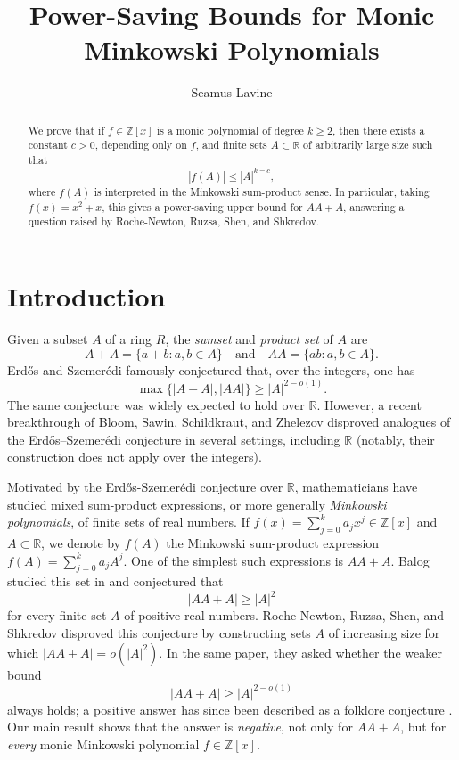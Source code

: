 \documentclass[11pt]{amsart}
\title{Power-Saving Bounds for Monic Minkowski Polynomials}
\theoremstyle{plain}
\theoremstyle{definition}\newtheorem{remark}[theorem]{Remark}
\theoremstyle{definition}\newtheorem*{remark*}{Remark}
\theoremstyle{definition}\newtheorem{definition}[theorem]{Definition}
\theoremstyle{definition}\newtheorem*{definition*}{Definition}
\theoremstyle{definition}\newtheorem*{idea}{Idea}
\theoremstyle{definition}\newtheorem*{comments}{Comment}
\theoremstyle{definition}\newtheorem{example}[theorem]{Example}
\theoremstyle{definition}\newtheorem*{example*}{Example}
\newcommand{\0}{\varnothing} %
\def\Z{\mathbb{Z}} %
\def\R{\mathbb{R}} %
\begin{document}
\begin{abstract}
We prove that if $f\in \Z[x]$ is a monic polynomial of degree
$k\geq 2$, then there exists a constant $c>0$, depending only on $f$, and finite sets
$A\subset \mathbb R$ of arbitrarily large size such that
\[
|f(A)|\leq |A|^{k-c},
\]
where $f(A)$ is interpreted in the Minkowski sum-product sense. In
particular, taking $f(x)=x^2+x$, this gives a power-saving upper bound
for $AA+A$, answering a question raised by Roche-Newton, Ruzsa, Shen, and
Shkredov.
\end{abstract}

\author{Seamus Lavine}

\maketitle

\section{Introduction}
Given a subset $A$ of a ring $R$, the \textit{sumset} and \textit{product set} of $A$ are
\[
A+A=\{a+b:a,b\in A\}\quad\text{and}\quad AA=\{ab:a,b\in A\}.
\]
Erd\H{o}s and Szemer\'{e}di famously conjectured that, over the integers, one has
\[
\max\{|A+A|,|AA|\}\geq|A|^{2-o(1)}.
\]
The same conjecture was widely expected to hold over $\R$. However, a recent breakthrough of Bloom, Sawin, Schildkraut, and Zhelezov \cite{BloomSawinSchildkrautZhelezov2026} disproved analogues of the Erd\H{o}s--Szemer\'edi conjecture in several settings, including $\R$ (notably, their construction does not apply over the integers).

Motivated by the Erd\H{o}s-Szemer\'edi conjecture over $\R$, mathematicians have studied mixed sum-product expressions, or more generally \textit{Minkowski polynomials}, of finite sets of real numbers. If $f(x)=\sum_{j=0}^k a_jx^j\in\Z[x]$ and $A\subset \R$, we denote by $f(A)$ the Minkowski sum-product expression $f(A)=\sum_{j=0}^k a_jA^j$. One of the simplest such expressions is $AA+A$. Balog studied this set in \cite{Balog2011} and conjectured that 
\[
|AA+A|\geq |A|^2
\]
for every finite set $A$ of positive real numbers. Roche-Newton, Ruzsa, Shen, and Shkredov \cite{RocheNewtonRuzsaShenShkredov2019} disproved this conjecture by constructing sets $A$ of increasing size for which $|AA+A|=o(|A|^2)$. In the same paper, they asked whether the weaker bound 
\[
|AA+A|\geq |A|^{2-o(1)}
\]
always holds; a positive answer has since been described as a folklore conjecture \cite{AgrawalBloomPetridis2025}. Our main result shows that the answer is \textit{negative}, not only for $AA+A$, but for \textit{every} monic Minkowski polynomial $f\in\Z[x]$. 
\end{document}
